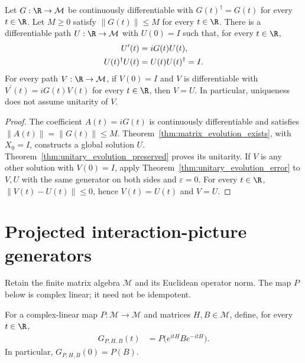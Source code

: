 \begin{theorem}
    \label{thm:unitary_evolution_unique}
    \leanok
    Let $G:\R\to\mathcal M$ be continuously differentiable with
    $G(t)^\dagger=G(t)$ for every $t\in\R$.
    Let $M\ge0$ satisfy $\|G(t)\|\le M$ for every $t\in\R$.
    There is a differentiable path $U:\R\to\mathcal M$ with $U(0)=I$
    such that, for every $t\in\R$,
    \begin{align}
        U^{\prime}(t)&=iG(t)U(t),
        \label{eq:unitary_evolution_unique}\\
        U(t)^\dagger U(t)&=U(t)U(t)^\dagger=I.\notag
    \end{align}
    For every path $V:\R\to\mathcal M$, if $V(0)=I$ and $V$ is
    differentiable with $V^{\prime}(t)=iG(t)V(t)$ for every $t\in\R$, then
    $V=U$. In particular, uniqueness does not assume unitarity of $V$.
\end{theorem}
\begin{proof}\leanok
    The coefficient $A(t)=iG(t)$ is continuously differentiable and
    satisfies $\|A(t)\|=\|G(t)\|\le M$.
    Theorem~\ref{thm:matrix_evolution_exists}, with $X_0=I$, constructs
    a global solution $U$. Theorem~\ref{thm:unitary_evolution_preserved}
    proves its unitarity.
    If $V$ is any other solution with $V(0)=I$, apply
    Theorem~\ref{thm:unitary_evolution_error} to $V,U$ with the same
    generator on both sides and $\varepsilon=0$. For every $t\in\R$,
    $\|V(t)-U(t)\|\le0$, hence $V(t)=U(t)$ and $V=U$.
\end{proof}

\section{Projected interaction-picture generators}
\label{sec:projected_unitary_evolution}

Retain the finite matrix algebra $\mathcal M$ and its Euclidean operator
norm. The map $P$ below is complex linear; it need not be idempotent.

\begin{definition}
    \label{def:projected_generator}
    \leanok
    For a complex-linear map $P:\mathcal M\to\mathcal M$ and matrices
    $H,B\in\mathcal M$, define, for every $t\in\R$,
    \begin{align}
        G_{P,H,B}(t)&=P\bigl(e^{itH}Be^{-itH}\bigr).
        \label{eq:projected_generator}
    \end{align}
    In particular, $G_{P,H,B}(0)=P(B)$.
\end{definition}


